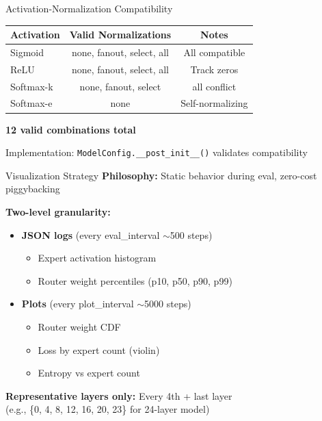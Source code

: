 \documentclass{beamer}
\begin{document}
\begin{frame}{Activation-Normalization Compatibility}
\begin{table}
\centering
\small
\begin{tabular}{@{}lcc@{}}
\toprule
\textbf{Activation} & \textbf{Valid Normalizations} & \textbf{Notes} \\
\midrule
Sigmoid & none, fanout, select, all & All compatible \\
ReLU & none, fanout, select, all & Track zeros \\
Softmax-k & none, fanout, select & {\color{red}all conflict} \\
Softmax-e & none & {\color{red}Self-normalizing} \\
\bottomrule
\end{tabular}
\end{table}

\vspace{0.3cm}
\textbf{12 valid combinations total}

\vspace{0.2cm}
Implementation: \texttt{ModelConfig.\_\_post\_init\_\_()} validates compatibility
\end{frame}

\begin{frame}{Visualization Strategy}
\textbf{Philosophy:} Static behavior during eval, zero-cost piggybacking

\vspace{0.3cm}
\textbf{Two-level granularity:}
\begin{itemize}
    \item \textbf{JSON logs} (every eval\_interval $\sim$500 steps)
    \begin{itemize}
        \item Expert activation histogram
        \item Router weight percentiles (p10, p50, p90, p99)
    \end{itemize}

    \item \textbf{Plots} (every plot\_interval $\sim$5000 steps)
    \begin{itemize}
        \item Router weight CDF
        \item Loss by expert count (violin)
        \item Entropy vs expert count
    \end{itemize}
\end{itemize}

\vspace{0.3cm}
\textbf{Representative layers only:} Every 4th + last layer\\
(e.g., \{0, 4, 8, 12, 16, 20, 23\} for 24-layer model)
\end{frame}
\end{document}
